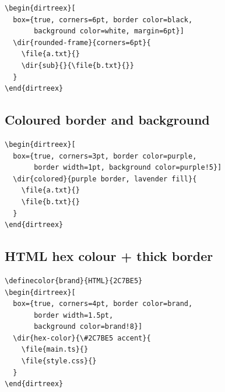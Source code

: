\documentclass[11pt]{article}
\begin{document}
\begin{Verbatim}
\begin{dirtreex}[
  box={true, corners=6pt, border color=black,
       background color=white, margin=6pt}]
  \dir{rounded-frame}{corners=6pt}{
    \file{a.txt}{}
    \dir{sub}{}{\file{b.txt}{}}
  }
\end{dirtreex}
\end{Verbatim}

\begin{dirtreex}[
  box={true, corners=6pt, border color=black,
       background color=white, margin=6pt}]
\end{dirtreex}

\subsection{Coloured border and background}

\begin{Verbatim}
\begin{dirtreex}[
  box={true, corners=3pt, border color=purple,
       border width=1pt, background color=purple!5}]
  \dir{colored}{purple border, lavender fill}{
    \file{a.txt}{}
    \file{b.txt}{}
  }
\end{dirtreex}
\end{Verbatim}

\begin{dirtreex}[
  box={true, corners=3pt, border color=purple,
       border width=1pt, background color=purple!5}]
\end{dirtreex}

\subsection{HTML hex colour + thick border}

\begin{Verbatim}
\definecolor{brand}{HTML}{2C7BE5}
\begin{dirtreex}[
  box={true, corners=4pt, border color=brand,
       border width=1.5pt,
       background color=brand!8}]
  \dir{hex-color}{\#2C7BE5 accent}{
    \file{main.ts}{}
    \file{style.css}{}
  }
\end{dirtreex}
\end{Verbatim}

\begin{dirtreex}[
  box={true, corners=4pt, border color=brand,
       border width=1.5pt,
       background color=brand!8}]
\end{dirtreex}
\end{document}
